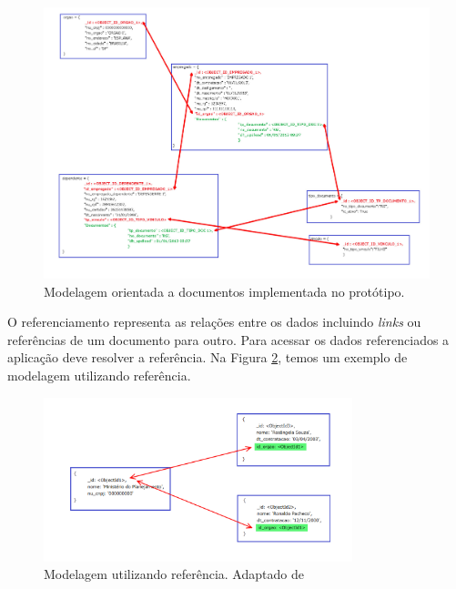 	\begin{figure}[!htbp]
		\begin{center}
			\includegraphics[width=1.4\textwidth, angle=-90]{modelo_orientado_documentos}
		\end{center}
		\caption{ Modelagem orientada a documentos implementada no protótipo.}
		\label{fig:modeloorientadodocumentos}
	\end{figure}


O referenciamento representa as relações entre os dados incluindo \textit{links} ou referências de um documento para outro. Para acessar os dados referenciados a aplicação deve resolver a referência. Na Figura \ref{fig:referencia}, temos um exemplo de modelagem utilizando referência.

	\begin{figure}[!htbp]
		\begin{center}
			\includegraphics[width=0.8\textwidth]{referencia}
		\end{center}
		\caption{ Modelagem utilizando referência. Adaptado de ~\cite{sitemongodb}}
		\label{fig:referencia}
	\end{figure}


